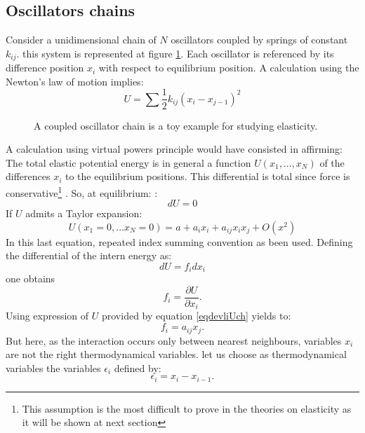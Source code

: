\documentclass[12pt]{book}
\begin{document}
\subsection{Oscillators chains}
Consider a unidimensional chain of $N$ oscillators coupled by springs of
constant $k_{ij}$. this system is represented at figure
\ref{figchaineosc}. Each oscillator is referenced by its difference position
$x_i$ with respect to equilibrium position.
A calculation using the Newton's law of motion implies:
\begin{equation}
U=\sum\frac{1}{2}k_{ij}(x_i-x_{j-1})^2
\end{equation}
\begin{figure}[htb]
 \centerline{}   
 \caption{A coupled oscillator chain is a toy example for studying
   elasticity.} 
 \label{figchaineosc}
\end{figure}
A calculation using virtual powers principle would have consisted in
affirming:
The total elastic potential energy is in general a function $U(x_1,\dots,
x_N)$ of the differences $x_i$ to the equilibrium positions. This differential
is total since force is conservative\footnote{%
This assumption is the most difficult to prove in the theories on elasticity
as it will be shown at next section}%
. So, at equilibrium:
 :
\begin{equation}
dU=0
\end{equation}
If $U$ admits a Taylor expansion:
\begin{equation}\label{eqdevliUch}
U(x_1=0,\dots x_N=0)=a+a_i x_i+a_{ij}x_ix_j+O(x^2)
\end{equation}
In this last equation, repeated index summing convention as been used. Defining
the differential of the intern energy as:
\begin{equation}
dU=f_i dx_i
\end{equation}
one obtains
\begin{equation}
f_i=\frac{\partial U}{\partial x_i}.
\end{equation}
Using expression of $U$ provided by equation \ref{eqdevliUch} yields to:
\begin{equation}
f_i=a_{ij}x_j.
\end{equation}
But here, as the interaction occurs only between nearest neighbours, variables
$x_i$ are not the right thermodynamical variables.
let us choose as thermodynamical variables the variables $\epsilon_i$ defined
by: 
\begin{equation}
\epsilon_i=x_i-x_{i-1}.
\end{equation}
\end{document}
